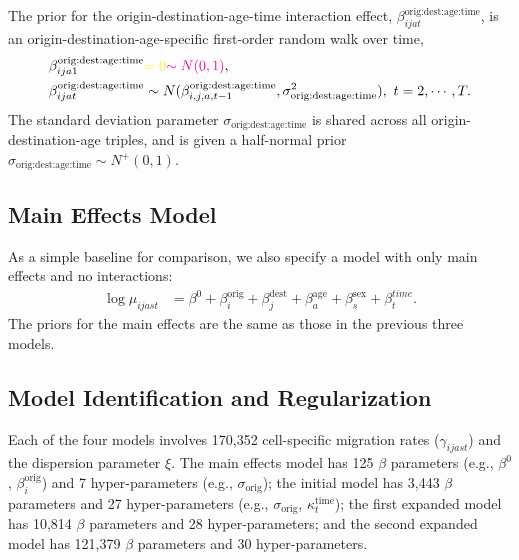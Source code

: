 \documentclass{article}
\begin{document}
The prior for the origin-destination-age-time interaction effect, $\beta_{ijat}^{\text{orig:dest:age:time}}$, is an origin-destination-age-specific first-order random walk over time,
\begin{equation}
\begin{aligned}
\beta_{ija1}^{\text{orig:dest:age:time}}&{\color{yellow}=0}{\color{magenta}\sim N(0,1)},\\
\beta_{ijat}^{\text{orig:dest:age:time}}&\sim N(\beta_{i,j,a,t-1}^{\text{orig:dest:age:time}},\sigma_{\text{orig:dest:age:time}}^2),\ t=2,\cdots,T.
\end{aligned}
\end{equation}
The standard deviation parameter $\sigma_{\text{orig:dest:age:time}}$ is shared across all origin-destination-age triples, and is given a half-normal prior $\sigma_{\text{orig:dest:age:time}}\sim N^+(0,1)$. 

\subsection{{\color{magenta}Main Effects Model}}
{\color{magenta}As a simple baseline for comparison, we also specify a model with only main effects and no interactions:
\begin{equation*}
\begin{aligned}
 \log \mu_{ijast} &= \beta^0 + \beta_i^{\text{orig}}+\beta_j^{\text{dest}}+\beta_{a}^{\text{age}}+\beta_{s}^{\text{sex}}+\beta_t^{time}.
\end{aligned}
\end{equation*}
The priors for the main effects are the same as those in the previous three models.}

\subsection{{\color{magenta}Model Identification and Regularization}}

{\color{magenta}Each of the four models involves 170,352 cell-specific migration rates ($\gamma_{ijast}$) and the dispersion parameter $\xi$. The main effects model has 125 $\beta$ parameters (e.g., $\beta^0$, $\beta_i^{\text{orig}}$) and 7 hyper-parameters (e.g., $\sigma_{\text{orig}}$); the initial model has 3,443 $\beta$ parameters and 27 hyper-parameters (e.g., $\sigma_{\text{orig}}$, $\kappa_t^{\text{time}}$); the first expanded model has 10,814 $\beta$ parameters and 28 hyper-parameters; and the second expanded model has 121,379 $\beta$ parameters and 30 hyper-parameters.}
\end{document}
